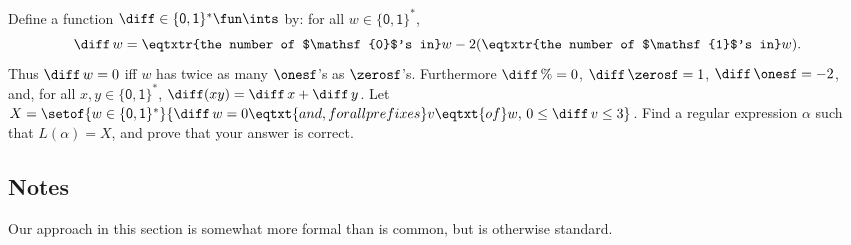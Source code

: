 \begin{exercise}
Define a function $\diff\in\{\mathsf{0,1}\}^*\fun\ints$ by:
for all $w\in\{\mathsf{0,1}\}^*$,
\begin{displaymath}
\diff\,w =
\eqtxtr{the number of $\mathsf{0}$'s in}w -
2(\eqtxtr{the number of $\mathsf{1}$'s in}w) .
\end{displaymath}
Thus $\diff\,w = 0$ iff $w$ has twice as many $\onesf$'s as
$\zerosf$'s.  Furthermore $\diff\,\%=0$, $\diff\,\zerosf = 1$,
$\diff\,\onesf = -2$, and, for all $x,y\in\{\mathsf{0,1}\}^*$,
$\diff(xy) = \diff\,x + \diff\,y$.  Let
$X=\setof{w\in\{\mathsf{0,1}\}^*}{\diff\,w=0\eqtxt{and, for all
    prefixes} v\eqtxt{of}w,\,0\leq\diff\,v\leq 3}$.  Find a regular
expression $\alpha$ such that $L(\alpha)=X$, and prove that your
answer is correct.
\end{exercise}

%
%
%

\subsection{Notes}

Our approach in this section is somewhat more formal than is common, but
is otherwise standard.

